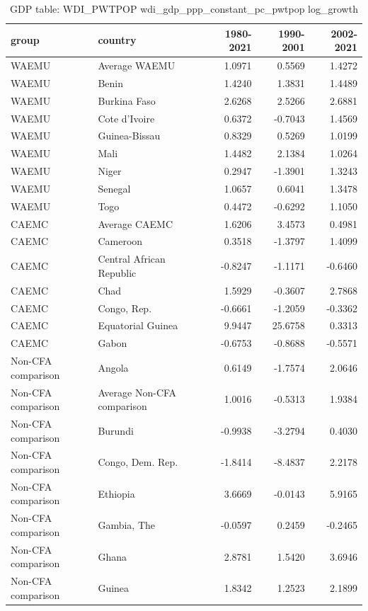 \begin{table}

\caption{GDP table: WDI_PWTPOP wdi_gdp_ppp_constant_pc_pwtpop log_growth}
\centering
\begin{tabular}[t]{llrrr}
\toprule
group & country & 1980-2021 & 1990-2001 & 2002-2021\\
\midrule
WAEMU & Average WAEMU & 1.0971 & 0.5569 & 1.4272\\
WAEMU & Benin & 1.4240 & 1.3831 & 1.4489\\
WAEMU & Burkina Faso & 2.6268 & 2.5266 & 2.6881\\
WAEMU & Cote d'Ivoire & 0.6372 & -0.7043 & 1.4569\\
WAEMU & Guinea-Bissau & 0.8329 & 0.5269 & 1.0199\\
\addlinespace
WAEMU & Mali & 1.4482 & 2.1384 & 1.0264\\
WAEMU & Niger & 0.2947 & -1.3901 & 1.3243\\
WAEMU & Senegal & 1.0657 & 0.6041 & 1.3478\\
WAEMU & Togo & 0.4472 & -0.6292 & 1.1050\\
CAEMC & Average CAEMC & 1.6206 & 3.4573 & 0.4981\\
\addlinespace
CAEMC & Cameroon & 0.3518 & -1.3797 & 1.4099\\
CAEMC & Central African Republic & -0.8247 & -1.1171 & -0.6460\\
CAEMC & Chad & 1.5929 & -0.3607 & 2.7868\\
CAEMC & Congo, Rep. & -0.6661 & -1.2059 & -0.3362\\
CAEMC & Equatorial Guinea & 9.9447 & 25.6758 & 0.3313\\
\addlinespace
CAEMC & Gabon & -0.6753 & -0.8688 & -0.5571\\
Non-CFA comparison & Angola & 0.6149 & -1.7574 & 2.0646\\
Non-CFA comparison & Average Non-CFA comparison & 1.0016 & -0.5313 & 1.9384\\
Non-CFA comparison & Burundi & -0.9938 & -3.2794 & 0.4030\\
Non-CFA comparison & Congo, Dem. Rep. & -1.8414 & -8.4837 & 2.2178\\
\addlinespace
Non-CFA comparison & Ethiopia & 3.6669 & -0.0143 & 5.9165\\
Non-CFA comparison & Gambia, The & -0.0597 & 0.2459 & -0.2465\\
Non-CFA comparison & Ghana & 2.8781 & 1.5420 & 3.6946\\
Non-CFA comparison & Guinea & 1.8342 & 1.2523 & 2.1899\\

\end{tabular}
\end{table}
